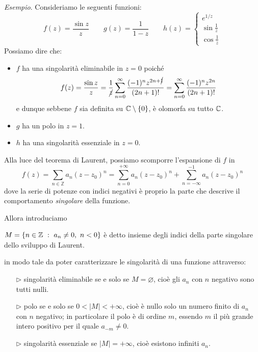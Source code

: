 \textit{Esempio}. Consideriamo le seguenti funzioni:\leavevmode
\begin{equation*}
f(z)=\frac{\sin z}{z} \qquad g(z)=\frac{1}{1-z} \qquad h(z)=\begin{cases}
e^{1/z} \\ \sin\frac{1}{z} \\ \cos\frac{1}{z}
\end{cases}
\end{equation*}
Possiamo dire che:
\begin{itemize}
    \item $f$ ha una singolarità eliminabile in $z=0$ poiché
    \begin{equation*}
    f(z) = \frac{\sin z}{z} = \frac{1}{\cancel{z}}\sum\limits^{\infty}_{n = 0}\frac{(- 1)^{n} z^{2n+\cancel{1}}}{(2n + 1) !} = \sum\limits^{\infty}_{n = 0}\frac{(- 1)^{n} z^{2n}}{(2n + 1) !}
    \end{equation*}
    e dunque sebbene $f$ sia definita su $\mathbb{C}\setminus\{0\}$, è olomorfa su tutto $\mathbb{C}$.
    \item $g$ ha un polo in $z=1$.
    \item $h$ ha una singolarità essenziale in $z=0$.
\end{itemize}

Alla luce del teorema di Laurent, possiamo scomporre l'espansione di $f$ in
\begin{equation*}
f(z)=\sum_{n \in \mathbb{Z}} a_n\left(z-z_0\right)^n=\sum_{n=0}^{+\infty} a_n\left(z-z_0\right)^n+\sum_{n=-\infty}^{-1} a_n\left(z-z_0\right)^n
\end{equation*}
dove la serie di potenze con indici negativi è proprio la parte che descrive il comportamento \textit{singolare} della funzione.

Allora introduciamo
\begin{defn}
$M=\left\{n\in\mathbb{Z}\ :\ a_n\neq 0,\ n<0 \right\}$ è detto insieme degli indici della parte singolare dello sviluppo di Laurent.
\end{defn}
in modo tale da poter caratterizzare le singolarità di una funzione attraverso:
\begin{enumerate}
    \item [$\triangleright$] singolarità eliminabile se e solo se $M=\varnothing$, cioè gli $a_n$ con $n$ negativo sono tutti nulli.
    \item [$\triangleright$] polo se e solo se $0<|M|<+\infty$, cioè è nullo solo un numero finito di $a_n$ con $n$ negativo; in particolare il polo è di ordine $m$, essendo $m$ il più grande intero positivo per il quale $a_{-m}\neq 0$.
    \item [$\triangleright$] singolarità essenziale se $|M|=+\infty$, cioè esistono infiniti $a_n$.
\end{enumerate}

